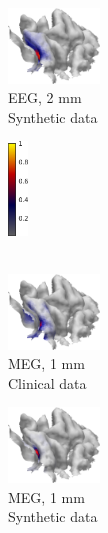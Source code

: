 \documentclass[5p]{elsarticle}
\begin{document}
\begin{figure}[h!]
\begin{footnotesize}
\begin{center}
\begin{minipage}{3cm}
\begin{center}
\end{center}\end{minipage}
\begin{minipage}{3cm} \begin{center}
\includegraphics[height=2.0cm]{CM_EEG_G_2mm_syntheticdata.png} \\ EEG, 2 mm \\ Synthetic data
\end{center}\end{minipage}
\begin{minipage}{0.5cm} \begin{center}
\includegraphics[height=2.5cm]{colorbar.png} \\ \mbox{} \\ \mbox{}
\end{center}
\end{minipage} \vskip0.2cm
\begin{minipage}{3cm} \begin{center}
\includegraphics[height=2.0cm]{CM_MEG_G_1mm.png} \\ MEG, 1 mm \\ Clinical data
\end{center}\end{minipage}
\begin{minipage}{3cm} \begin{center}
\includegraphics[height=2.0cm]{CM_MEG_G_1mm_syntheticdata.png} \\ MEG, 1 mm \\ Synthetic data

\end{center}
\end{minipage}
\end{center}
\end{footnotesize}
\end{figure}
\end{document}
